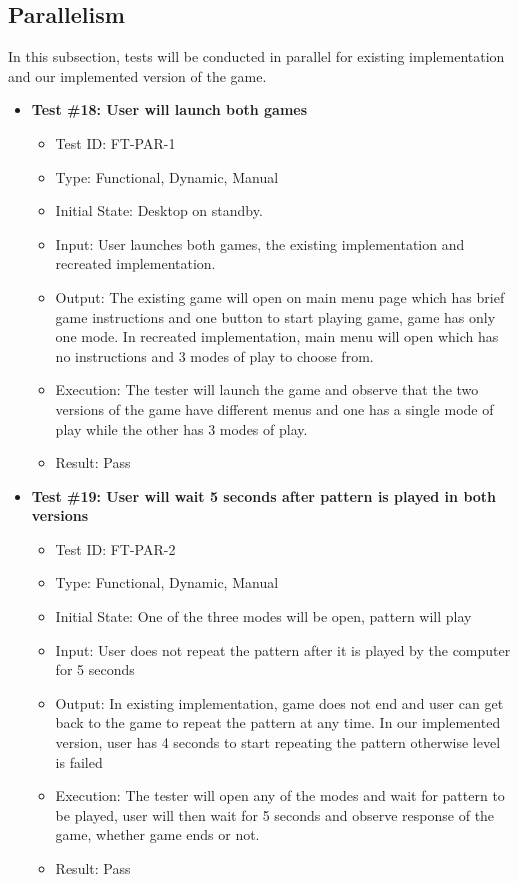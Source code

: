 \documentclass[12pt, titlepage]{article}
\begin{document}
\subsection{Parallelism}
In this subsection, tests will be conducted in parallel for existing implementation and our implemented version of the game.

\begin{itemize}

\item \textbf{Test \#18: User will launch both games }
\begin{itemize}
\item Test ID: FT-PAR-1
\item Type: Functional, Dynamic, Manual 		
\item Initial State: Desktop on standby.					
\item Input: User launches both games, the existing implementation and recreated implementation. 	
\item Output: The existing game will open on main menu page which has brief game instructions and one button to start playing game, game has only one mode. In recreated implementation, main menu will open which has no instructions and 3 modes of play to choose from.
\item Execution: The tester will launch the game and observe that the two versions of the game have different menus and one has a single mode of play while the other has 3 modes of play.
\item Result: Pass
\end{itemize}

\item \textbf{Test \#19: User will wait 5 seconds after pattern is played in both versions }
\begin{itemize}
\item Test ID: FT-PAR-2
\item Type: Functional, Dynamic, Manual 		
\item Initial State: One of the three modes will be open, pattern will play					
\item Input: User does not repeat the pattern after it is played by the computer for 5 seconds	
\item Output: In existing implementation, game does not end and user can get back to the game to repeat the pattern at any time. In our implemented version, user has 4 seconds to start repeating the pattern otherwise level is failed				
\item Execution: The tester will open any of the modes and wait for pattern to be played, user will then wait for 5 seconds and observe response of the game, whether game ends or not.
\item Result: Pass
\end{itemize}


\end{itemize}
\end{document}
